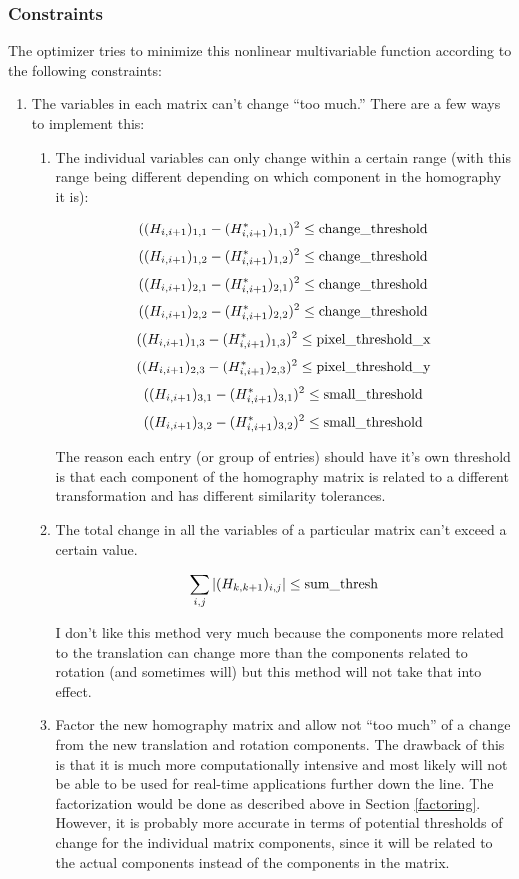 \documentclass{article}
\begin{document}
\subsubsection{Constraints}

The optimizer tries to minimize this nonlinear multivariable function according
to the following constraints:

\begin{enumerate}

\item The variables in each matrix can't change ``too much.'' There are a few
ways to implement this:

\begin{enumerate}

\item \label{indiv_thresh} The individual variables can only change within a certain range (with
this range being different depending on which component in the homography it
is):

\[((H_{i, i+1})_{1, 1} - (H_{i, i+1}^{*})_{1, 1})^2 \leq \textnormal{change\_threshold}\] 
\[((H_{i, i+1})_{1, 2} - (H_{i, i+1}^{*})_{1, 2})^2 \leq \textnormal{change\_threshold}\] 
\[((H_{i, i+1})_{2, 1} - (H_{i, i+1}^{*})_{2, 1})^2 \leq \textnormal{change\_threshold}\] 
\[((H_{i, i+1})_{2, 2} - (H_{i, i+1}^{*})_{2, 2})^2 \leq \textnormal{change\_threshold}\] 
\[((H_{i, i+1})_{1, 3} - (H_{i, i+1}^{*})_{1, 3})^2 \leq \textnormal{pixel\_threshold\_x}\] 
\[((H_{i, i+1})_{2, 3} - (H_{i, i+1}^{*})_{2, 3})^2 \leq \textnormal{pixel\_threshold\_y}\] 
\[((H_{i, i+1})_{3, 1} - (H_{i, i+1}^{*})_{3, 1})^2 \leq \textnormal{small\_threshold}\] 
\[((H_{i, i+1})_{3, 2} - (H_{i, i+1}^{*})_{3, 2})^2 \leq \textnormal{small\_threshold}\] 

The reason each entry (or group of entries) should have it's own threshold is
that each component of the homography matrix is related to a different
transformation and has different similarity tolerances. 

\item The total change in all the variables of a particular matrix can't exceed a certain value.

\[\sum_{i, j} |(H_{k, k+1})_{i, j}| \leq \textnormal{sum\_thresh}\]

I don't like this method very much because the components more related to the
translation can change more than the components related to rotation (and
sometimes will) but this method will not take that into effect. 

\item Factor the new homography matrix and allow not ``too much'' of a change
from the new translation and rotation components. The drawback of this is that
it is much more computationally intensive and most likely will not be able to
be used for real-time applications further down the line. The factorization
would be done as described above in Section \ref{factoring}. However, it is
probably more accurate in terms of potential thresholds of change for the
individual matrix components, since it will be related to the actual components
instead of the components in the matrix. 


\end{enumerate}
\end{enumerate}
\end{document}
